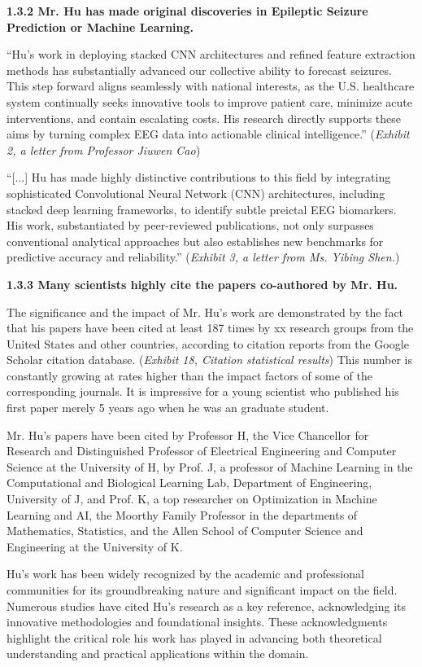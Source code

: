 \documentclass{article}
\begin{document}
{\bf 1.3.2 Mr. Hu has made original discoveries in Epileptic Seizure Prediction or Machine Learning. }

“Hu’s work in deploying stacked CNN architectures and refined feature extraction methods has substantially advanced our collective ability to forecast seizures. This step forward aligns seamlessly with national interests, as the U.S. healthcare system continually seeks innovative tools to improve patient care, minimize acute interventions, and contain escalating costs. His research directly supports these aims by turning complex EEG data into actionable clinical intelligence.” ({\it Exhibit 2, a letter from Professor Jiuwen Cao}) 

“[...] Hu has made highly distinctive contributions to this field by integrating sophisticated Convolutional Neural Network (CNN) architectures, including stacked deep learning frameworks, to identify subtle preictal EEG biomarkers. His work, substantiated by peer-reviewed publications, not only surpasses conventional analytical approaches but also establishes new benchmarks for predictive accuracy and reliability.” ({\it Exhibit 3, a letter from Ms. Yibing Shen.}) 

{\bf 1.3.3 Many scientists highly cite the papers co-authored by Mr. Hu. }

The significance and the impact of Mr. Hu’s work are demonstrated by the fact that his papers have been cited at least 187 times by xx research groups from the United States and other countries, according to citation reports from the Google Scholar citation database. ({\it Exhibit 18, Citation statistical results}) This number is constantly growing at rates higher than the impact factors of some of the corresponding journals. It is impressive for a young scientist who published his first paper merely 5 years ago when he was an graduate student. 

Mr. Hu’s papers have been cited by Professor H, the Vice Chancellor for Research and Distinguished Professor of Electrical Engineering and Computer Science at the University of H, by Prof. J, a professor of Machine Learning in the Computational and Biological Learning Lab, Department of Engineering, University of J, and Prof. K, a top researcher on Optimization in Machine Learning and AI, the Moorthy Family Professor in the departments of Mathematics, Statistics, and the Allen School of Computer Science and Engineering at the University of K.

Hu’s work has been widely recognized by the academic and professional communities for its groundbreaking nature and significant impact on the field. Numerous studies have cited Hu's research as a key reference, acknowledging its innovative methodologies and foundational insights. These acknowledgments highlight the critical role his work has played in advancing both theoretical understanding and practical applications within the domain.
\end{document}
